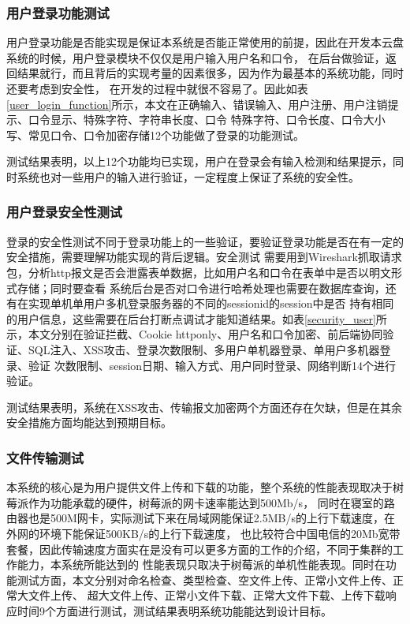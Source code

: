 \subsubsection{用户登录功能测试}
用户登录功能是否能实现是保证本系统是否能正常使用的前提，因此在开发本云盘系统的时候，用户登录模块不仅仅是用户输入用户名和口令，
在后台做验证，返回结果就行，而且背后的实现考量的因素很多，因为作为最基本的系统功能，同时还要考虑到安全性，
在开发的过程中就很不容易了。因此如表\ref{user_login_function}所示，本文在正确输入、错误输入、用户注册、用户注销提示、口令显示、特殊字符、字符串长度、口令
特殊字符、口令长度、口令大小写、常见口令、口令加密存储12个功能做了登录的功能测试。

测试结果表明，以上12个功能均已实现，用户在登录会有输入检测和结果提示，同时系统也对一些用户的输入进行验证，一定程度上保证了系统的安全性。

\subsubsection{用户登录安全性测试}
登录的安全性测试不同于登录功能上的一些验证，要验证登录功能是否在有一定的安全措施，需要理解功能实现的背后逻辑。安全测试
需要用到Wireshark抓取请求包，分析http报文是否会泄露表单数据，比如用户名和口令在表单中是否以明文形式存储；同时要查看
系统后台是否对口令进行哈希处理也需要在数据库查询，还有在实现单机单用户多机登录服务器的不同的sessionid的session中是否
持有相同的用户信息，这些需要在后台打断点调试才能知道结果。如表\ref{security_user}所示，本文分别在验证拦截、Cookie 
httponly、用户名和口令加密、前后端协同验证、SQL注入、XSS攻击、登录次数限制、多用户单机器登录、单用户多机器登录、验证
次数限制、session日期、输入方式、用户同时登录、网络判断14个进行验证。

测试结果表明，系统在XSS攻击、传输报文加密两个方面还存在欠缺，但是在其余安全措施方面均能达到预期目标。

\subsubsection{文件传输测试}
本系统的核心是为用户提供文件上传和下载的功能，整个系统的性能表现取决于树莓派作为功能承载的硬件，树莓派的网卡速率能达到500Mb/s，
同时在寝室的路由器也是500M网卡，实际测试下来在局域网能保证2.5MB/s的上行下载速度，在外网的环境下能保证500KB/s的上行下载速度，
也比较符合中国电信的20Mb宽带套餐，因此传输速度方面实在是没有可以更多方面的工作的介绍，不同于集群的工作能力，本系统所能达到的
性能表现只取决于树莓派的单机性能表现。同时在功能测试方面，本文分别对命名检查、类型检查、空文件上传、正常小文件上传、正常大文件上传、
超大文件上传、正常小文件下载、正常大文件下载、上传下载响应时间9个方面进行测试，测试结果表明系统功能能达到设计目标。

